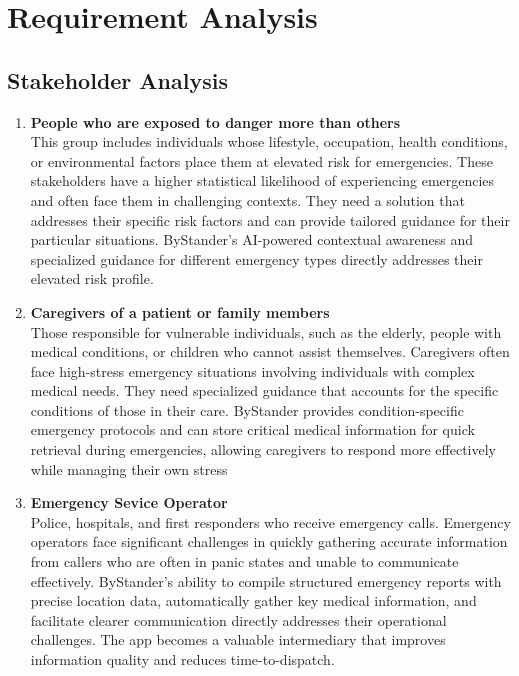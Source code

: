 \chapter{Requirement Analysis}
\label{chap:requirement-analysis}

\section{Stakeholder Analysis}
\label{section:stakeholder-analysis}
\begin{enumerate}
    \item \textbf{People who are exposed to danger more than others} \\
    This group includes individuals whose lifestyle, occupation, health conditions, or environmental factors place them at elevated risk for emergencies. These stakeholders have a higher statistical likelihood of experiencing emergencies and often face them in challenging contexts. They need a solution that addresses their specific risk factors and can provide tailored guidance for their particular situations. ByStander's AI-powered contextual awareness and specialized guidance for different emergency types directly addresses their elevated risk profile.

    \item \textbf{Caregivers of a patient or family members} \\
    Those responsible for vulnerable individuals, such as the elderly, people with medical conditions, or children who cannot assist themselves. Caregivers often face high-stress emergency situations involving individuals with complex medical needs. They need specialized guidance that accounts for the specific conditions of those in their care. ByStander provides condition-specific emergency protocols and can store critical medical information for quick retrieval during emergencies, allowing caregivers to respond more effectively while managing their own stress

    \item \textbf{Emergency Sevice Operator} \\
    Police, hospitals, and first responders who receive emergency calls. Emergency operators face significant challenges in quickly gathering accurate information from callers who are often in panic states and unable to communicate effectively. ByStander's ability to compile structured emergency reports with precise location data, automatically gather key medical information, and facilitate clearer communication directly addresses their operational challenges. The app becomes a valuable intermediary that improves information quality and reduces time-to-dispatch.


\end{enumerate}
